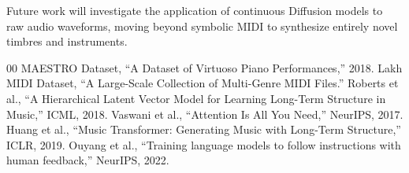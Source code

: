 \documentclass[conference]{IEEEtran}
\begin{document}
Future work will investigate the application of continuous Diffusion models to raw audio waveforms, moving beyond symbolic MIDI to synthesize entirely novel timbres and instruments.

\begin{thebibliography}{00}
 MAESTRO Dataset, ``A Dataset of Virtuoso Piano Performances,'' 2018.
 Lakh MIDI Dataset, ``A Large-Scale Collection of Multi-Genre MIDI Files.''
 Roberts et al., ``A Hierarchical Latent Vector Model for Learning Long-Term Structure in Music,'' ICML, 2018.
 Vaswani et al., ``Attention Is All You Need,'' NeurIPS, 2017.
 Huang et al., ``Music Transformer: Generating Music with Long-Term Structure,'' ICLR, 2019.
 Ouyang et al., ``Training language models to follow instructions with human feedback,'' NeurIPS, 2022.
\end{thebibliography}
\end{document}
